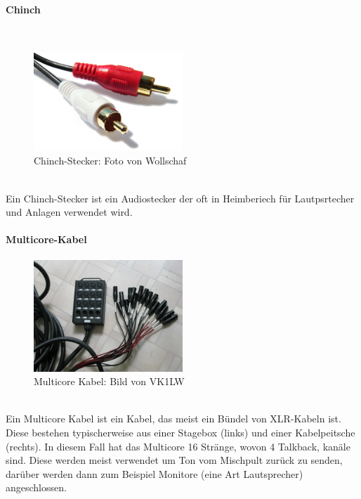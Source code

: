 \paragraph{Chinch}~\\
\begin{figure}[h]
    \centering
    \includegraphics[width=0.5\textwidth]{Bilder/Cinch-Stecker.jpg}
    \caption{Chinch-Stecker: Foto von Wollschaf \cite{wiki:Wollschaf}}
    \label{fig:Chinch}
\end{figure}
~\\
Ein Chinch-Stecker ist ein Audiostecker der oft in Heimberiech für Lautpsrtecher und Anlagen verwendet wird. \cite{dewiki:Chinch}



\paragraph{Multicore-Kabel}
\begin{figure}[h]
    \centering
    \includegraphics[width=0.5\textwidth]{Bilder/Medientechnik/Audio_multicore_cable_with_XLR_connectors_and_stage_box.JPG}
    \caption{Multicore Kabel: Bild von VK1LW \cite{wiki:VK1LW}}
    \label{fig:Multicore}
\end{figure}~\\
Ein Multicore Kabel ist ein Kabel, das meist ein Bündel von XLR-Kabeln ist. Diese bestehen typischerweise aus einer Stagebox (links) und einer Kabelpeitsche (rechts). In diesem Fall hat das Multicore 16 Stränge, wovon 4 Talkback, kanäle sind. Diese werden meist verwendet um Ton vom Mischpult zurück zu senden, darüber werden dann zum Beispiel Monitore (eine Art Lautsprecher) angeschlossen. \newpage
